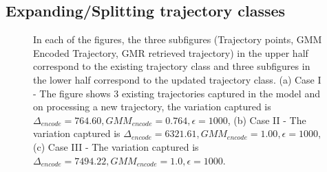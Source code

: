 \documentclass[conference]{IEEEtran}
\begin{document}
\subsection{Expanding/Splitting trajectory classes}

\begin{figure}[!t]
\centerline{
}
\centerline{
}
\caption{In each of the figures, the three subfigures (Trajectory points, GMM Encoded Trajectory, GMR retrieved trajectory) in the upper half correspond to the existing trajectory class and three subfigures in the lower half correspond to the updated trajectory class. (a) Case I - The figure shows 3 existing trajectories captured in the model and on processing a new trajectory, the variation captured is $\Delta_{encode} = 764.60, GMM_{encode} = 0.764, \epsilon=1000$, (b) Case II - The variation captured is $\Delta_{encode} = 6321.61, GMM_{encode} = 1.00, \epsilon=1000$, (c) Case III - The variation captured is $\Delta_{encode} = 7494.22, GMM_{encode} = 1.0, \epsilon=1000$.}
\label{fig:fig4}
\end{figure}
\end{document}
